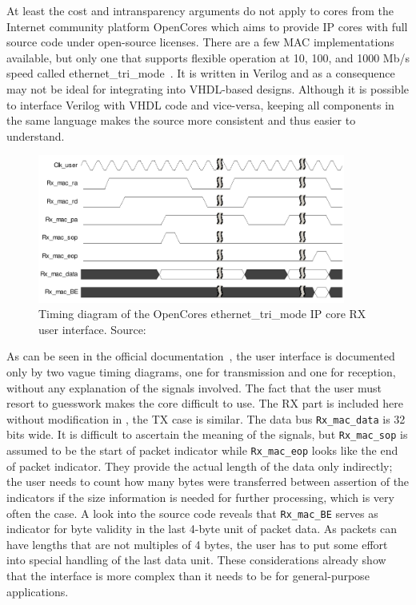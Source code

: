 \documentclass[a4paper, 11pt, oneside]{Thesis}  %
\begin{document}
At least the cost and intransparency arguments do not apply to cores from the Internet community platform OpenCores which aims to provide IP cores with full source code under open-source licenses. There are a few MAC implementations available, but only one that supports flexible operation at 10, 100, and 1000 Mb/s speed called ethernet\_tri\_mode~\cite{MAC_opencores}. It is written in Verilog and as a consequence may not be ideal for integrating into VHDL-based designs. Although it is possible to interface Verilog with VHDL code and vice-versa, keeping all components in the same language makes the source more consistent and thus easier to understand.

\begin{figure}
\centering
\includegraphics[width=0.9\textwidth]{Figures/oc_rx}
\caption[Timing diagram of the OpenCores ethernet\_tri\_mode IP core RX user interface]{Timing diagram of the OpenCores ethernet\_tri\_mode IP core RX user interface. Source:~\cite{OCMAC}}
\label{fig:oc_rx}
\end{figure}

As can be seen in the official documentation~\cite{OCMAC}, the user interface is documented only by two vague timing diagrams, one for transmission and one for reception, without any explanation of the signals involved. The fact that the user must resort to guesswork makes the core difficult to use. The RX part is included here without modification in , the TX case is similar. The data bus \texttt{Rx\_mac\_data} is 32 bits wide. It is difficult to ascertain the meaning of the signals, but \texttt{Rx\_mac\_sop} is assumed to be the start of packet indicator while \texttt{Rx\_mac\_eop} looks like the end of packet indicator. They provide the actual length of the data only indirectly; the user needs to count how many bytes were transferred between assertion of the indicators if the size information is needed for further processing, which is very often the case. A look into the source code reveals that \texttt{Rx\_mac\_BE} serves as indicator for byte validity in the last 4-byte unit of packet data. As packets can have lengths that are not multiples of 4 bytes, the user has to put some effort into special handling of the last data unit. These considerations already show that the interface is more complex than it needs to be for general-purpose applications.
\end{document}
